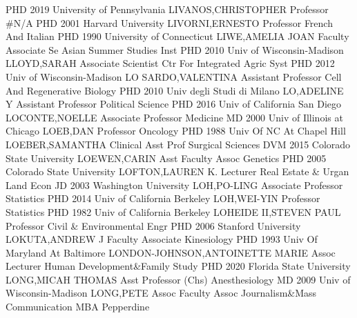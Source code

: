 \documentclass[
]{article}
\begin{document}
\textbar PHD 2019 University of Pennsylvania
\textbar LIVANOS,CHRISTOPHER \textbar{}  \textbar Professor
\textbar\#N/A \textbar PHD 2001 Harvard University
\textbar LIVORNI,ERNESTO \textbar{}  \textbar Professor
\textbar French And Italian \textbar PHD 1990 University of Connecticut
\textbar LIWE,AMELIA JOAN \textbar{}  \textbar Faculty
Associate \textbar Se Asian Summer Studies Inst \textbar PHD 2010 Univ
of Wisconsin-Madison \textbar LLOYD,SARAH \textbar{} 
\textbar Associate Scientist \textbar Ctr For Integrated Agric Syst
\textbar PHD 2012 Univ of Wisconsin-Madison \textbar LO SARDO,VALENTINA
\textbar{}  \textbar Assistant Professor \textbar Cell And
Regenerative Biology \textbar PHD 2010 Univ degli Studi di Milano
\textbar LO,ADELINE Y \textbar{}  \textbar Assistant
Professor \textbar Political Science \textbar PHD 2016 Univ of
California San Diego \textbar LOCONTE,NOELLE \textbar{} 
\textbar Associate Professor \textbar Medicine \textbar MD 2000 Univ of
Illinois at Chicago \textbar LOEB,DAN \textbar{} 
\textbar Professor \textbar Oncology \textbar PHD 1988 Univ Of NC At
Chapel Hill \textbar LOEBER,SAMANTHA \textbar{} 
\textbar Clinical Asst Prof \textbar Surgical Sciences \textbar DVM 2015
Colorado State University \textbar LOEWEN,CARIN \textbar{} 
\textbar Asst Faculty Assoc \textbar Genetics \textbar PHD 2005 Colorado
State University \textbar LOFTON,LAUREN K. \textbar{} 
\textbar Lecturer \textbar Real Estate \& Urgan Land Econ \textbar JD
2003 Washington University \textbar LOH,PO-LING \textbar{} 
\textbar Associate Professor \textbar Statistics \textbar PHD 2014 Univ
of California Berkeley \textbar LOH,WEI-YIN \textbar{} 
\textbar Professor \textbar Statistics \textbar PHD 1982 Univ of
California Berkeley \textbar LOHEIDE II,STEVEN PAUL \textbar{}
 \textbar Professor \textbar Civil \& Environmental Engr
\textbar PHD 2006 Stanford University \textbar LOKUTA,ANDREW J
\textbar{}  \textbar Faculty Associate \textbar Kinesiology
\textbar PHD 1993 Univ Of Maryland At Baltimore
\textbar LONDON-JOHNSON,ANTOINETTE MARIE \textbar{} 
\textbar Assoc Lecturer \textbar Human Development\&Family Study
\textbar PHD 2020 Florida State University \textbar LONG,MICAH THOMAS
\textbar{}  \textbar Asst Professor (Chs)
\textbar Anesthesiology \textbar MD 2009 Univ of Wisconsin-Madison
\textbar LONG,PETE \textbar{}  \textbar Assoc Faculty Assoc
\textbar Journalism\&Mass Communication \textbar MBA Pepperdine
\end{document}
